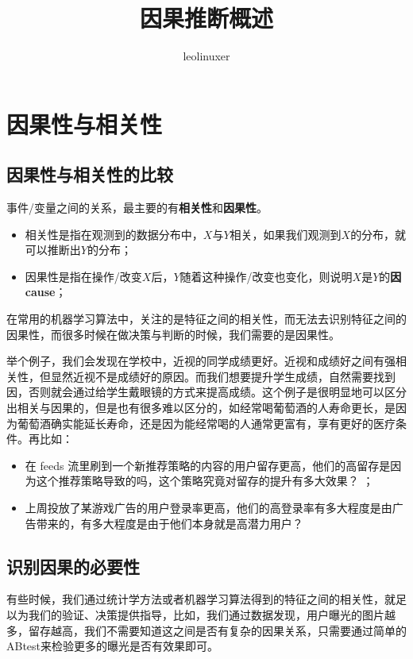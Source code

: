 \documentclass[12pt]{article}
\title{因果推断概述\cite{Causal_Inference_Simply_Introduction}\cite{Talk_About_Causal_Inference_Part_1}\cite{AAAI_2020_Tutorial_Representation_Learning_for_Causal_Inference}}
\author{leolinuxer}
\begin{document}
\maketitle
\tableofcontents

\section{因果性与相关性}
\subsection{因果性与相关性的比较}
事件/变量之间的关系，最主要的有\textbf{相关性}和\textbf{因果性}。
\begin{itemize}
\setlength{\itemsep}{0pt}
\setlength{\parsep}{0pt}
\setlength{\parskip}{0pt}
    \item 相关性是指在观测到的数据分布中，$X$与$Y$相关，如果我们观测到$X$的分布，就可以推断出$Y$的分布；
    \item 因果性是指在操作/改变$X$后，$Y$随着这种操作/改变也变化，则说明$X$是$Y$的\textbf{因cause}；
\end{itemize}

在常用的机器学习算法中，关注的是特征之间的相关性，而无法去识别特征之间的因果性，而很多时候在做决策与判断的时候，我们需要的是因果性。

举个例子，我们会发现在学校中，近视的同学成绩更好。近视和成绩好之间有强相关性，但显然近视不是成绩好的原因。而我们想要提升学生成绩，自然需要找到因，否则就会通过给学生戴眼镜的方式来提高成绩。这个例子是很明显地可以区分出相关与因果的，但是也有很多难以区分的，如经常喝葡萄酒的人寿命更长，是因为葡萄酒确实能延长寿命，还是因为能经常喝的人通常更富有，享有更好的医疗条件。再比如：
\begin{itemize}
\setlength{\itemsep}{0pt}
\setlength{\parsep}{0pt}
\setlength{\parskip}{0pt}
    \item 在 feeds 流里刷到一个新推荐策略的内容的用户留存更高，他们的高留存是因为这个推荐策略导致的吗，这个策略究竟对留存的提升有多大效果？
；
    \item 上周投放了某游戏广告的用户登录率更高，他们的高登录率有多大程度是由广告带来的，有多大程度是由于他们本身就是高潜力用户？
\end{itemize}


\subsection{识别因果的必要性}
有些时候，我们通过统计学方法或者机器学习算法得到的特征之间的相关性，就足以为我们的验证、决策提供指导，比如，我们通过数据发现，用户曝光的图片越多，留存越高，我们不需要知道这之间是否有复杂的因果关系，只需要通过简单的ABtest来检验更多的曝光是否有效果即可。
\end{document}
